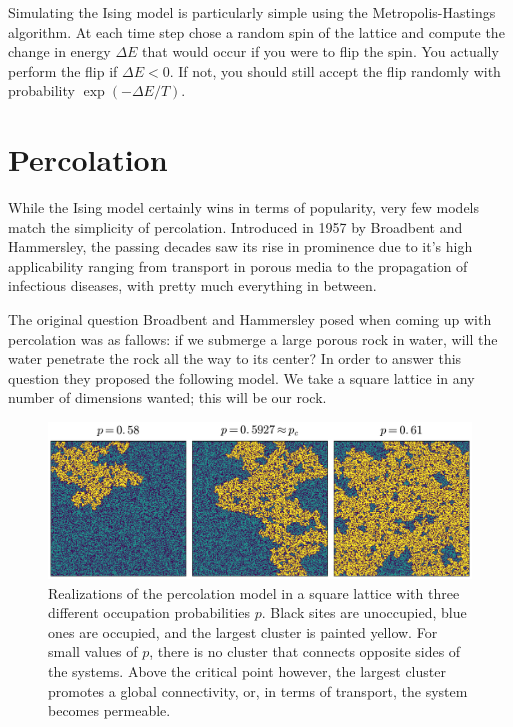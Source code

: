Simulating the Ising model is particularly simple using the Metropolis-Hastings
algorithm. At each time step chose a random spin of the lattice and compute the
change in energy $\Delta E$ that would occur if you were to flip the spin. You
actually perform the flip if $\Delta E < 0$. If not, you should still accept
the flip randomly with probability $\exp(-\Delta E / T)$.

\section{Percolation}
\label{sec:perc}

While the Ising model certainly wins in terms of popularity, very few models
match the simplicity of percolation. Introduced in 1957 by Broadbent and
Hammersley, the passing decades saw its rise in prominence due to it's high
applicability ranging from transport in porous media to the propagation of
infectious diseases, with pretty much everything in between.

The original question Broadbent and Hammersley posed when coming up with
percolation was as fallows: if we submerge a large porous rock in water, will
the water penetrate the rock all the way to its center? In order to answer this
question they proposed the following model. We take a square lattice in any
number of dimensions wanted; this will be our rock.

\begin{figure}
\begin{center}
    \includegraphics[scale=0.4]{chapters/ch2-crit/figs/isoperco}
\end{center}
\caption{Realizations of the percolation model in a square lattice with three
    different occupation probabilities $p$. Black sites are unoccupied, blue
    ones are occupied, and the largest cluster is painted yellow. For small
    values of $p$, there is no cluster that connects opposite sides of the
    systems. Above the critical point however, the largest cluster promotes a
    global connectivity, or, in terms of transport, the system becomes
    permeable.}
\label{fig:isoperco}
\end{figure}

